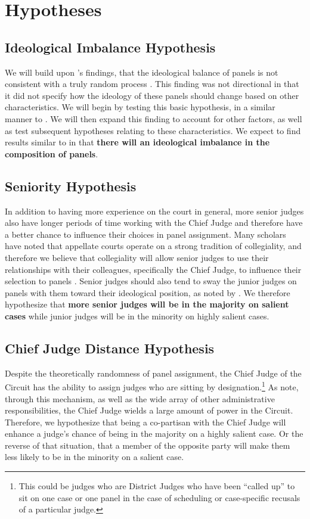 \documentclass[12pt]{article}
\begin{document}
\section{Hypotheses}\label{Hypotheses}
\subsection*{Ideological Imbalance Hypothesis}
We will build upon \citeauthor{Chilton2014}'s findings, that the ideological balance of panels is not consistent with a truly random process \citep[20]{Chilton2014}.  This finding was not directional in that it did not specify how the ideology of these panels should change based on other characteristics.  We will begin by testing this basic hypothesis, in a similar manner to \citet{Chilton2014}.  We will then expand this finding to account for other factors, as well as test subsequent hypotheses relating to these characteristics.  We expect to find results similar to \citet{Chilton2014} in that \textbf{there will an ideological imbalance in the composition of panels}.

\subsection*{Seniority Hypothesis}
In addition to having more experience on the court in general, more senior judges also have longer periods of time working with the Chief Judge and therefore have a better chance to influence their choices in panel assignment.  Many scholars have noted that appellate courts operate on a strong tradition of collegiality, and therefore we believe that collegiality will allow senior judges to use their relationships with their colleagues, specifically the Chief Judge, to influence their selection to panels \cite{Atkins1974,feinberg1984office,Brown2000}. Senior judges should also tend to sway the junior judges on panels with them toward their ideological position, as noted by \citet{landes1998judicial}.  We therefore hypothesize that \textbf{more senior judges will be in the majority on salient cases} while junior judges will be in the minority on highly salient cases.

\subsection*{Chief Judge Distance Hypothesis}
Despite the theoretically randomness of panel assignment, the Chief Judge of the Circuit has the ability to assign judges who are sitting by designation.\footnote{This could be judges who are District Judges who have been ``called up'' to sit on one case or one panel in the case of scheduling or case-specific recusals of a particular judge.}  As \citet{Atkins1974} note, through this mechanism, as well as the wide array of other administrative responsibilities, the Chief Judge wields a large amount of power in the Circuit.  Therefore, we hypothesize that being a co-partisan with the Chief Judge will enhance a judge's chance of being in the majority on a highly salient case.  Or the reverse of that situation, that a member of the opposite party will make them less likely to be in the minority on a salient case.   
\end{document}
